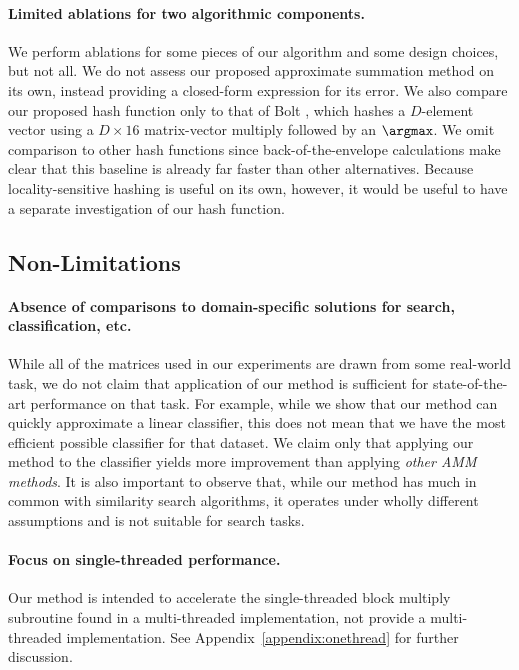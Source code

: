 \paragraph{Limited ablations for two algorithmic components.}
We perform ablations for some pieces of our algorithm and some design choices, but not all. We do not assess our proposed approximate summation method on its own, instead providing a closed-form expression for its error. We also compare our proposed hash function only to that of Bolt \cite{bolt}, which hashes a $D$-element vector using a $D \times 16$ matrix-vector multiply followed by an $\argmax$. We omit comparison to other hash functions since back-of-the-envelope calculations make clear that this baseline is already far faster than other alternatives. Because locality-sensitive hashing is useful on its own, however, it would be useful to have a separate investigation of our hash function.


\subsection{Non-Limitations}

\paragraph{Absence of comparisons to domain-specific solutions for search, classification, etc.} While all of the matrices used in our experiments are drawn from some real-world task, we do not claim that application of our method is sufficient for state-of-the-art performance on that task. For example, while we show that our method can quickly approximate a linear classifier, this does not mean that we have the most efficient possible classifier for that dataset. We claim only that applying our method to the classifier yields more improvement than applying \textit{other AMM methods}. It is also important to observe that, while our method has much in common with similarity search algorithms, it operates under wholly different assumptions and is not suitable for search tasks.

\paragraph{Focus on single-threaded performance.}
Our method is intended to accelerate the single-threaded block multiply subroutine found in a multi-threaded implementation, not provide a multi-threaded implementation. See Appendix~\ref{appendix:onethread} for further discussion.




